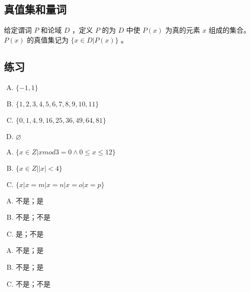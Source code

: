 {    \subsection{真值集和量词}
    {
        给定谓词 $P$ 和论域 $D$ ，定义 $P$ 的为 $D$ 中使 $P(x)$ 为真的元素 $x$ 组成的集合。
        $P(x)$ 的真值集记为 $\{x \in D | P(x)\}$ 。
    }

    \subsection{练习}
    {
        \begin{practices}
            \begin{enumerate}[A.]
                \item $\{-1, 1\}$
                \item $\{1, 2, 3, 4, 5, 6, 7, 8, 9, 10, 11\}$
                \item $\{0, 1, 4, 9, 16, 25, 36, 49, 64, 81\}$
                \item $\varnothing$
            \end{enumerate}
        \end{practices}

        \begin{practices}
            \begin{enumerate}[A.]
                \item $\{x \in Z | x mod 3 = 0 \wedge 0 \leq x \leq 12\}$
                \item $\{x \in Z | |x| < 4\}$
                \item $\{x | x = m | x = n | x = o | x = p\}$
            \end{enumerate}
        \end{practices}

        \begin{practices}
            \begin{enumerate}[A.]
                \item 不是；是
                \item 不是；不是
                \item 是；不是
            \end{enumerate}
        \end{practices}

        \begin{practices}
            \begin{enumerate}[A.]
                \item 不是；是
                \item 不是；是
                \item 不是；不是
            \end{enumerate}
        \end{practices}

}}
